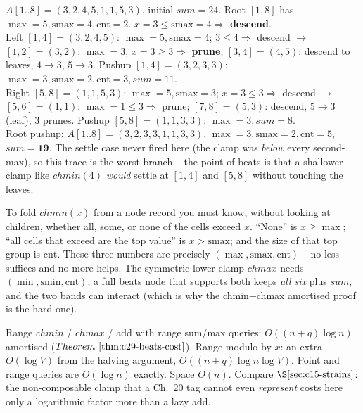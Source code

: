 \begin{tracebox}
\(A[1..8]=(3,2,4,5,1,1,5,3)\), initial \(\mathit{sum}=24\).  Root \([1,8]\) has
\(\max=5,\mathrm{smax}=4,\mathrm{cnt}=2\).  \(x=3\le\mathrm{smax}=4\Rightarrow\)
\textbf{descend}.\\
Left \([1,4]=(3,2,4,5)\): \(\max=5,\mathrm{smax}=4\); \(3\le4\Rightarrow\) descend
  \(\to\) \([1,2]=(3,2)\): \(\max=3\), \(x=3\ge3\Rightarrow\) \textbf{prune};
  \([3,4]=(4,5)\): descend to leaves, \(4\!\to\!3\), \(5\!\to\!3\).
  Pushup \([1,4]=(3,2,3,3)\): \(\max=3,\mathrm{smax}=2,\mathrm{cnt}=3,\mathit{sum}=11\).\\
Right \([5,8]=(1,1,5,3)\): \(\max=5,\mathrm{smax}=3\); \(x=3\le3\Rightarrow\) descend
  \(\to\) \([5,6]=(1,1)\): \(\max=1\le3\Rightarrow\) prune; \([7,8]=(5,3)\): descend,
  \(5\!\to\!3\) (leaf), \(3\) prunes.  Pushup \([5,8]=(1,1,3,3)\): \(\max=3,\mathit{sum}=8\).\\
Root pushup: \(A[1..8]=(3,2,3,3,1,1,3,3)\), \(\max=3,\mathrm{smax}=2,\mathrm{cnt}=5\),
\(\mathbf{\mathit{sum}=19}\).  The settle case never fired here (the clamp was
\emph{below} every second-max), so this trace is the worst branch -- the point of
beats is that a shallower clamp like \(\mathit{chmin}(4)\) \emph{would} settle at
\([1,4]\) and \([5,8]\) without touching the leaves.
\end{tracebox}

\begin{observation}
To fold \(\mathit{chmin}(x)\) from a node record you must know, without looking at
children, whether all, some, or none of the cells exceed \(x\).  ``None'' is
\(x\ge\max\); ``all cells that exceed are the top value'' is
\(x>\mathrm{smax}\); and the size of that top group is \(\mathrm{cnt}\).  These
three numbers are precisely \((\max,\mathrm{smax},\mathrm{cnt})\) -- no less
suffices and no more helps.  The symmetric lower clamp \(\mathit{chmax}\) needs
\((\min,\mathrm{smin},\mathrm{cnt})\); a full beats node that supports both keeps
\emph{all six} plus \(\mathit{sum}\), and the two bands can interact (which is why
the chmin+chmax amortised proof is the hard one).
\end{observation}

\begin{complexitybox}
Range \(\mathit{chmin}\) / \(\mathit{chmax}\) / add with range sum/max queries:
\(O((n+q)\log n)\) amortised (\(\thmref{c29-beats-cost}\)).  Range modulo by \(x\):
an extra \(O(\log V)\) from the halving argument, \(O((n+q)\log n\log V)\).  Point
and range queries are \(O(\log n)\) exactly.  Space \(O(n)\).  Compare
\(\secref{c15-strains}\): the non-composable clamp that a Ch.~20 tag cannot even
\emph{represent} costs here only a logarithmic factor more than a lazy add.
\end{complexitybox}

